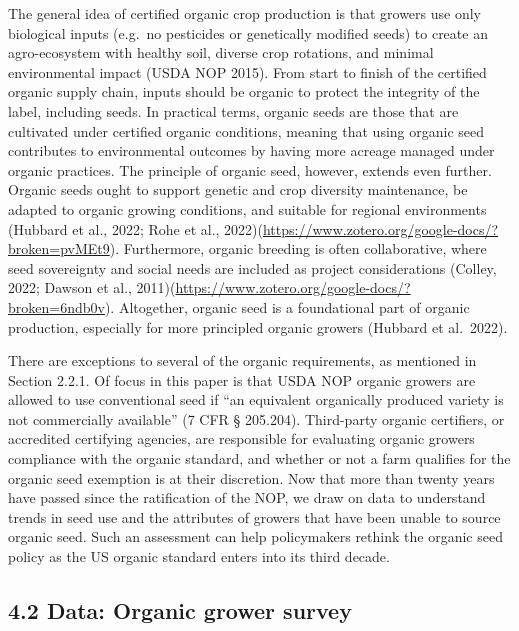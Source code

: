 \documentclass[twoside,12pt,final]{ucthesis-CA2012}
\begin{document}
\begin{ucmainmatter}
The general idea of certified organic crop production is that growers
use only biological inputs (e.g.~no pesticides or genetically modified
seeds) to create an agro-ecosystem with healthy soil, diverse crop
rotations, and minimal environmental impact (USDA NOP 2015). From start
to finish of the certified organic supply chain, inputs should be
organic to \textquotesingle protect the integrity\textquotesingle{} of the label, including seeds. In
practical terms, organic seeds are those that are cultivated under
certified organic conditions, meaning that using organic seed
contributes to environmental outcomes by having more acreage managed
under organic practices. The principle of organic seed, however, extends
even further. Organic seeds ought to support genetic and crop diversity
maintenance, be adapted to organic growing conditions, and suitable for
regional environments (Hubbard et al., 2022; Rohe et al.,
2022)(\url{https://www.zotero.org/google-docs/?broken=pvMEt9}). Furthermore,
organic breeding is often collaborative, where seed sovereignty and
social needs are included as project considerations (Colley, 2022;
Dawson et al.,
2011)(\url{https://www.zotero.org/google-docs/?broken=6ndb0v}). Altogether,
organic seed is a foundational part of organic production, especially
for more principled organic growers (Hubbard et al.~2022).

There are exceptions to several of the organic requirements, as
mentioned in Section 2.2.1. Of focus in this paper is that USDA NOP
organic growers are allowed to use conventional seed if ``an equivalent
organically produced variety is not commercially available'' (7 CFR §
205.204). Third-party organic certifiers, or accredited certifying
agencies, are responsible for evaluating organic growers\textquotesingle{} compliance
with the organic standard, and whether or not a farm qualifies for the
organic seed exemption is at their discretion. Now that more than twenty
years have passed since the ratification of the NOP, we draw on data to
understand trends in seed use and the attributes of growers that have
been unable to source organic seed. Such an assessment can help
policymakers rethink the organic seed policy as the US organic standard
enters into its third decade.

\hypertarget{data-organic-grower-survey}{%
\subsection{4.2 Data: Organic grower survey}\label{data-organic-grower-survey}}


\end{ucmainmatter}
\end{document}

